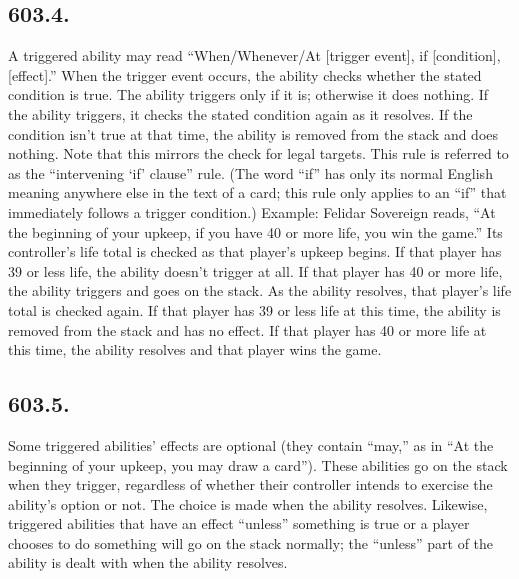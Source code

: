 \subsection*{603.4.}
A triggered ability may read “When/Whenever/At [trigger event], if [condition], [effect].” When the trigger event occurs, the ability checks whether the stated condition is true. The ability triggers only if it is; otherwise it does nothing. If the ability triggers, it checks the stated condition again as it resolves. If the condition isn’t true at that time, the ability is removed from the stack and does nothing. Note that this mirrors the check for legal targets. This rule is referred to as the “intervening ‘if’ clause” rule. (The word “if” has only its normal English meaning anywhere else in the text of a card; this rule only applies to an “if” that immediately follows a trigger condition.)
Example: Felidar Sovereign reads, “At the beginning of your upkeep, if you have 40 or more life, you win the game.” Its controller’s life total is checked as that player’s upkeep begins. If that player has 39 or less life, the ability doesn’t trigger at all. If that player has 40 or more life, the ability triggers and goes on the stack. As the ability resolves, that player’s life total is checked again. If that player has 39 or less life at this time, the ability is removed from the stack and has no effect. If that player has 40 or more life at this time, the ability resolves and that player wins the game.

\subsection*{603.5.}
Some triggered abilities’ effects are optional (they contain “may,” as in “At the beginning of your upkeep, you may draw a card”). These abilities go on the stack when they trigger, regardless of whether their controller intends to exercise the ability’s option or not. The choice is made when the ability resolves. Likewise, triggered abilities that have an effect “unless” something is true or a player chooses to do something will go on the stack normally; the “unless” part of the ability is dealt with when the ability resolves.

